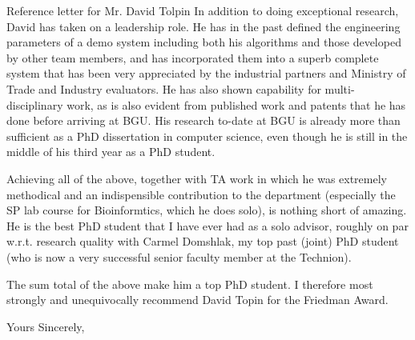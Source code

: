 \begin{letter}{  Reference letter for Mr. David Tolpin}
In addition to doing exceptional research, David
has taken on a leadership role. He has in the past defined the 
engineering parameters of a demo system including
both his algorithms and those developed by other team members, and has
incorporated them into a superb
complete system that has been very appreciated by the
industrial partners and Ministry of Trade and Industry evaluators.
He has also shown capability for multi-disciplinary work, as is also evident
from published work and patents that he has done before arriving at BGU.
His research to-date at BGU  is already more than sufficient
as a PhD dissertation in computer science, even though he is 
still in the middle of his third year as
a PhD student.

Achieving all of the above, together with TA work in which he was 
extremely methodical
and an indispensible contribution to the department (especially the 
SP lab course for Bioinformtics, which he does solo), is nothing
short of amazing. He is the
best PhD student that I have ever had as a solo advisor,
roughly on par w.r.t. research quality
with Carmel Domshlak, my top past (joint) PhD student
(who is now a very successful senior faculty member at the Technion).

The sum total of the above make him a top PhD student.
I therefore most strongly and 
unequivocally recommend David Topin for the
Friedman Award.


\closing{Yours Sincerely,}
\end{letter}





